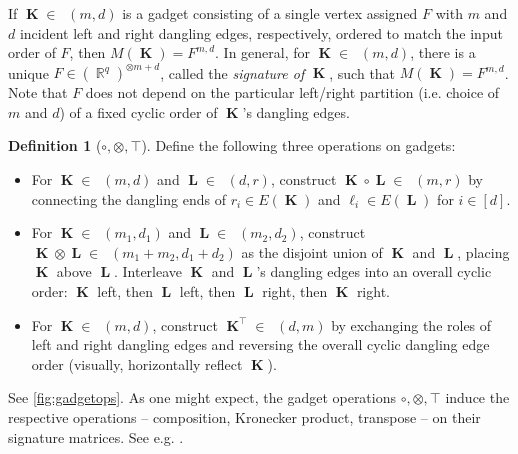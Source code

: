\documentclass{article}
\theoremstyle{remark}
\theoremstyle{definition}
\newtheorem{definition}{Definition}[section]
\DeclareMathOperator{\rr}{\mathbb{R}}
\DeclareMathOperator{\vk}{\mathbf{K}}
\DeclareMathOperator{\vl}{\mathbf{L}}
\DeclareMathOperator{\gk}{\mathfrak{G}_{\mathcal{F}}}
\begin{document}
If $\vk \in \gk(m,d)$ is a gadget consisting
of a single vertex assigned $F$ with $m$ and $d$ incident left and right dangling edges, 
respectively, ordered to match the input order of $F$, then $M(\vk) = F^{m,d}$.
In general, for $\vk \in \gk(m,d)$, there is a unique $F \in (\rr^q)^{\otimes m+d}$, called the \emph{signature of} $\vk$,
such that $M(\vk) = F^{m,d}$. Note that $F$ does not depend on the
particular left/right partition (i.e. choice of $m$ and $d$) of a fixed cyclic order 
of $\vk$'s dangling edges.
\begin{definition}[$\circ, \otimes, \top$]
    Define the following three operations on gadgets:
    \begin{itemize}
        \item For $\vk \in \gk(m,d)$ and $\vl \in \gk(d,r)$, construct $\vk \circ \vl \in \gk(m,r)$
            by connecting the dangling ends of $r_i \in E(\vk)$ and $\ell_i \in E(\vl)$ for $i \in [d]$.
        \item For $\vk \in \gk(m_1,d_1)$ and $\vl \in \gk(m_2,d_2)$, construct 
            $\vk \otimes \vl \in \gk(m_1+m_2,d_1+d_2)$ as the disjoint union of $\vk$ and $\vl$,
            placing $\vk$ above $\vl$. Interleave $\vk$ and $\vl$'s dangling edges into
            an overall cyclic order: $\vk$ left, then $\vl$ left, then $\vl$ right, then $\vk$ right.
        \item For $\vk \in \gk(m,d)$, construct $\vk^{\top} \in \gk(d,m)$ 
            by exchanging the roles of left and right dangling edges and reversing
            the overall cyclic dangling edge order (visually, horizontally reflect $\vk$).
    \end{itemize}
\end{definition}
See \autoref{fig:gadgetops}. As one might expect,
the gadget operations $\circ, \otimes, \top$ induce the respective operations -- composition, 
Kronecker product, transpose -- on their signature matrices. See e.g. 
\cite[Section 1.3]{cai_chen_2017}.
\end{document}

